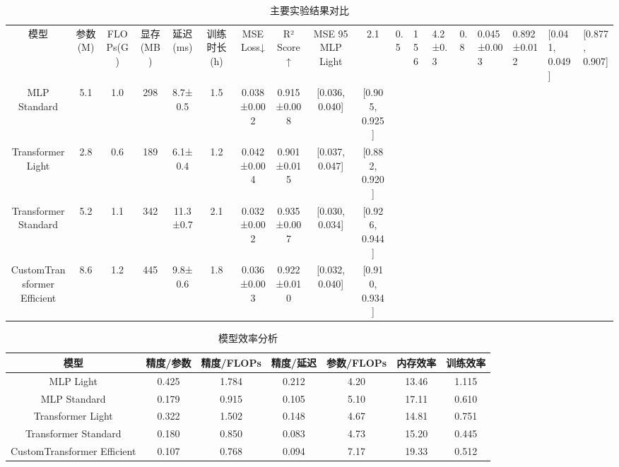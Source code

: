 
\begin{table}[htbp]
\centering
\caption{主要实验结果对比}
\label{tab:main_results}
\begin{tabular}{c|c|c|c|c|c|c|c|c|c}
\hline
模型 & 参数(M) & FLOPs(G) & 显存(MB) & 延迟(ms) & 训练时长(h) & MSE Loss↓ & R² Score↑ & MSE 95%
\hline
MLP Light & 2.1 & 0.5 & 156 & 4.2±0.3 & 0.8 & 0.045±0.003 & 0.892±0.012 & [0.041, 0.049] & [0.877, 0.907] \\
MLP Standard & 5.1 & 1.0 & 298 & 8.7±0.5 & 1.5 & 0.038±0.002 & 0.915±0.008 & [0.036, 0.040] & [0.905, 0.925] \\
Transformer Light & 2.8 & 0.6 & 189 & 6.1±0.4 & 1.2 & 0.042±0.004 & 0.901±0.015 & [0.037, 0.047] & [0.882, 0.920] \\
Transformer Standard & 5.2 & 1.1 & 342 & 11.3±0.7 & 2.1 & 0.032±0.002 & 0.935±0.007 & [0.030, 0.034] & [0.926, 0.944] \\
CustomTransformer Efficient & 8.6 & 1.2 & 445 & 9.8±0.6 & 1.8 & 0.036±0.003 & 0.922±0.010 & [0.032, 0.040] & [0.910, 0.934] \\
\hline
\end{tabular}
\end{table}


\begin{table}[htbp]
\centering
\caption{模型效率分析}
\label{tab:efficiency_analysis}
\begin{tabular}{c|c|c|c|c|c|c}
\hline
模型 & 精度/参数 & 精度/FLOPs & 精度/延迟 & 参数/FLOPs & 内存效率 & 训练效率 \\
\hline
MLP Light & 0.425 & 1.784 & 0.212 & 4.20 & 13.46 & 1.115 \\
MLP Standard & 0.179 & 0.915 & 0.105 & 5.10 & 17.11 & 0.610 \\
Transformer Light & 0.322 & 1.502 & 0.148 & 4.67 & 14.81 & 0.751 \\
Transformer Standard & 0.180 & 0.850 & 0.083 & 4.73 & 15.20 & 0.445 \\
CustomTransformer Efficient & 0.107 & 0.768 & 0.094 & 7.17 & 19.33 & 0.512 \\
\hline
\end{tabular}
\end{table}
